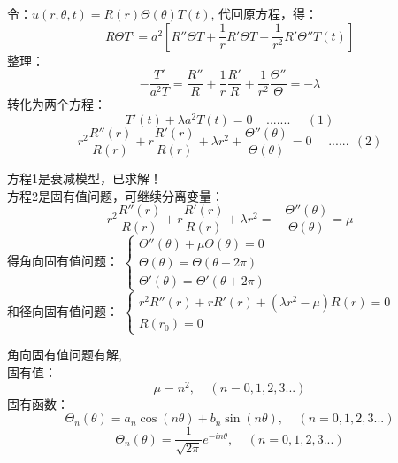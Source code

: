 \begin{frame}
	令：$u(r,\theta,t) =R(r)\Theta(\theta)T(t)$,  代回原方程，得：
	\begin{equation*}
		R\Theta T‘=a^2 [ R'' \Theta T + \dfrac{1}{r} R' \Theta T  + \dfrac{1}{r^2} R' \Theta '' T(t)  ]
	\end{equation*}
	整理：
	\begin{equation*}
		-\frac{T'}{a^2T} =\frac{R''}{R}+\frac{1}{r} \frac{R'}{R} +\frac{1}{r^2} \frac{\Theta ''} {\Theta}  =-\lambda
	\end{equation*}
	转化为两个方程：
	\begin{equation*}
		T'(t)+\lambda a^2T(t)=0  ~~~~~....... ~~~~~~(1)
	\end{equation*}
	\begin{equation*}
		r^2 \frac{R'' (r)}{R(r)}+r \frac{R'(r)}{R(r)} + \lambda r^2 +\frac{\Theta ''(\theta)} {\Theta (\theta)} =0  ~~~~~~......~~(2)
	\end{equation*}
\end{frame}	

\begin{frame}
	方程1是衰减模型，已求解！\\
	方程2是固有值问题，可继续分离变量：	
	\begin{equation*}
		r^2 \frac{R'' (r)}{R(r)}+r \frac{R'(r)}{R(r)} + \lambda r^2 =-\frac{\Theta ''(\theta)} {\Theta (\theta)} =\mu  
	\end{equation*}
	得角向固有值问题：
	$ \begin{cases}
		\Theta ''(\theta)+\mu \Theta (\theta) =0 \\
		\Theta (\theta) =	\Theta (\theta+2\pi)  \\
		\Theta' (\theta) =	\Theta' (\theta+2\pi)  
	\end{cases} $\\	
	和径向固有值问题：
	$ \begin{cases}
		r^2 R'' (r)+r R'(r) +( \lambda r^2 -\mu)R(r)=0  \\
		R(r_0)=0
	\end{cases} $\\	
\end{frame}	

\begin{frame}
	角向固有值问题有解,\\
	固有值：
	\begin{equation*}
		\mu=n^2, ~~~~~(n=0,1,2,3...)
	\end{equation*}
	固有函数：
	\begin{equation*}
		\Theta_n(\theta) = a_n \cos(n\theta)+b_n \sin(n\theta), ~~~~~(n=0,1,2,3...)
	\end{equation*}
	\begin{equation*}
		\Theta_n(\theta) = \frac{1}{\sqrt{2\pi}} e^{-i n \theta }, ~~~~~(n=0,1,2,3...)
	\end{equation*}
\end{frame}	

